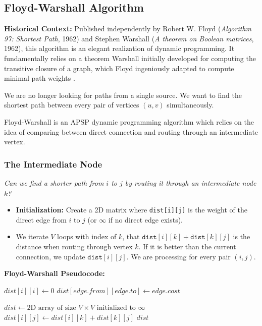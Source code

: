 \subsection{Floyd-Warshall Algorithm}
\textbf{Historical Context:} Published independently by Robert W. Floyd (\textit{Algorithm 97: Shortest Path}, 1962) and Stephen Warshall (\textit{A theorem on Boolean matrices}, 1962), this algorithm is an elegant realization of dynamic programming. It fundamentally relies on a theorem Warshall initially developed for computing the transitive closure of a graph, which Floyd ingeniously adapted to compute minimal path weights \cite{floyd1962algorithm97,warshall1962theorem}.

\vspace{0.2cm}
We are no longer looking for paths from a single source. We want to find the shortest path between every pair of vertices $(u, v)$ simultaneously.

Floyd-Warshall is an APSP dynamic programming algorithm which relies on the idea of comparing between direct connection and routing through an intermediate vertex.

\subsubsection{The Intermediate Node}
\textit{Can we find a shorter path from $i$ to $j$ by routing it through an intermediate node $k$?}

\begin{itemize}
    \item \textbf{Initialization:} Create a 2D matrix where \texttt{dist[i][j]} is the weight of the direct edge from $i$ to $j$ (or $\infty$ if no direct edge exists).
    \item We iterate $V$ loops with index of $k$, that $\texttt{dist}[i][k] + \texttt{dist}[k][j]$ is the distance when routing through vertex $k$. If it is better than the current connection, we update $\texttt{dist}[i][j]$. We are processing for every pair $(i, j)$.
\end{itemize}

\textbf{Floyd-Warshall Pseudocode:}
\begin{algorithm}[H]
\caption{Floyd-Warshall Algorithm}
\begin{algorithmic}[1]
        \State $dist[i][i] \gets 0$
    \EndFor
        \State $dist[edge.from][edge.to] \gets edge.cost$
    \EndFor
\EndFunction

    \State $dist \gets \text{2D array of size } V \times V \text{ initialized to } \infty$
    \State {}
                    \State $dist[i][j] \gets dist[i][k] + dist[k][j]$
                \EndIf
            \EndFor
        \EndFor
    \EndFor
    \State \Return $dist$
\EndFunction
\end{algorithmic}
\end{algorithm}

